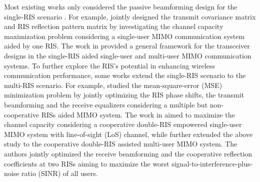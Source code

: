 \documentclass[journal]{IEEEtran}
\begin{document}
Most existing works only considered the passive beamforming design for the single-RIS scenario \cite{zhang2020capacity,9739078,9279253}. For example,\cite{zhang2020capacity} jointly designed the transmit covariance matrix and RIS reflection pattern matrix by investigating the channel capacity maximization problem considering a single-user MIMO communication system aided by one RIS.
The work in \cite{9739078} provided a general framework for the transceiver designs in
the single-RIS aided 
 single-user and multi-user MIMO communication systems.
To further explore the RIS's potential in enhancing wireless communication performance, some works extend the single-RIS scenario to the multi-RIS scenario. For example,
\cite{xu2022statistically} studied the  mean-square-error (MSE) minimization problem by jointly optimizing the RIS phase shifts, the transmit beamforming and the receive equalizers  considering a multiple but non-cooperative RISs aided MIMO system.
The work in \cite{9714463} aimed to maximize  the channel capacity considering a cooperative double-RIS empowered single-user MIMO system  with line-of-sight (LoS) channel, while
 \cite{zheng2021double} further extended the above study to the cooperative double-RIS assisted multi-user MIMO system. The authors jointly optimized the receive beamforming  and the cooperative reflection coefficients at two RISs aiming to maximize the worst signal-to-interference-plus-noise ratio (SINR) of all users. 
\end{document}
